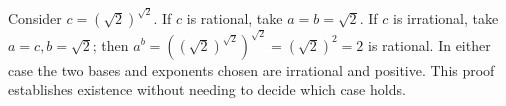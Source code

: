 Consider $c=(\sqrt2)^{\sqrt2}$. If $c$ is rational, take $a=b=\sqrt2$. If $c$ is irrational, take $a=c,b=\sqrt2$; then $a^b=((\sqrt2)^{\sqrt2})^{\sqrt2}=(\sqrt2)^2=2$ is rational. In either case the two bases and exponents chosen are irrational and positive. This proof establishes existence without needing to decide which case holds.
